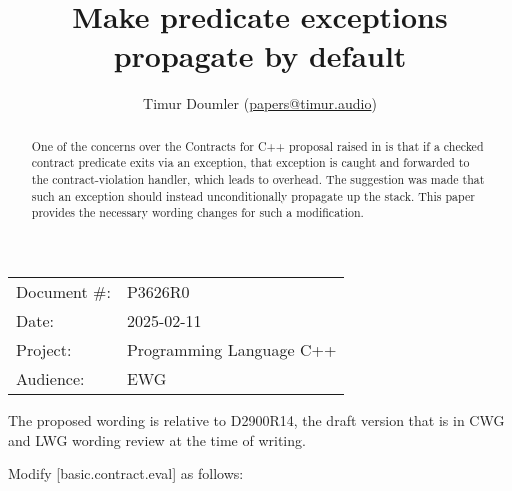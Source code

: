 \title{Make predicate exceptions propagate by default}
\author{
Timur Doumler \small(\href{mailto:papers@timur.audio}{papers@timur.audio}) 
}
\date{}
\maketitle

\begin{tabular}{ll}
Document \#: & P3626R0 \\
Date: &2025-02-11 \\
Project: & Programming Language C++ \\
Audience: & EWG
\end{tabular}

\begin{abstract}
One of the concerns over the Contracts for C++ proposal \cite{P2900R13} raised in \cite{P3573R0} is that if a checked contract predicate exits via an exception, that exception is caught and forwarded to the contract-violation handler, which leads to overhead. The suggestion was made that such an exception should instead unconditionally propagate up the stack. This paper provides the necessary wording changes for such a modification.
\end{abstract}







The proposed wording is relative to D2900R14, the draft version that is in CWG and LWG wording review at the time of writing.

Modify [basic.contract.eval] as follows:

